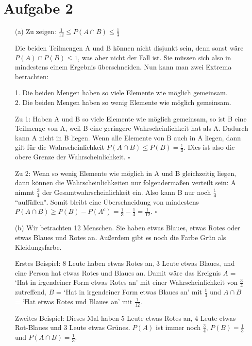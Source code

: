\documentclass[10pt,a4paper]{article}
\begin{document}
\section*{Aufgabe 2}
\begin{itemize}
\item[(a)]
Zu zeigen: $\frac{1}{12} \leq P(A \cap B) \leq \frac{1}{3}$

Die beiden Teilmengen A und B können nicht disjunkt sein, denn sonst wäre $P(A) \cap P(B) \leq 1$, was aber nicht der Fall ist. Sie müssen sich also in mindestens einem Ergebnis überschneiden. Nun kann man zwei Extrema betrachten:

1. Die beiden Mengen haben so viele Elemente wie möglich gemeinsam.\\
2. Die beiden Mengen haben so wenig Elemente wie möglich gemeinsam.

Zu 1: Haben A und B so viele Elemente wie möglich gemeinsam, so ist B eine Teilmenge von A, weil B eine geringere Wahrscheinlichkeit hat als A. Dadurch kann A nicht in B liegen. Wenn alle Elemente von B auch in A liegen, dann gilt für die Wahrscheinlichkeit $P(A \cap B) \leq P(B) = \frac{1}{3}$. Dies ist also die obere Grenze der Wahrscheinlichkeit. $\square$

Zu 2: Wenn so wenig Elemente wie möglich in A und B gleichzeitig liegen, dann können die Wahrscheinlichkeiten nur folgendermaßen verteilt sein:
A nimmt $\frac{3}{4}$ der Gesamtwahrscheinlichkeit ein. Also kann B nur noch $\frac{1}{4}$ ``auffüllen". Somit bleibt eine Überschneidung von mindestens $P(A \cap B) \geq P(B) - P(A^c) = \frac{1}{3} - \frac{1}{4} = \frac{1}{12}$. $\square$

\item[(b)]
Wir betrachten 12 Menschen. Sie haben etwas Blaues, etwas Rotes oder etwas Blaues und Rotes an. Außerdem gibt es noch die Farbe Grün als Kleidungsfarbe.

Erstes Beispiel: 8 Leute haben etwas Rotes an, 3 Leute etwas Blaues, und eine Person hat etwas Rotes und Blaues an. Damit wäre das Ereignis $A$ = `Hat in irgendeiner Form etwas Rotes an' mit einer Wahrscheinlichkeit von $\frac{3}{4}$ zutreffend, $B$ = `Hat in irgendeiner Form etwas Blaues an' mit $\frac{1}{3}$ und $A \cap B$ = `Hat etwas Rotes und Blaues an' mit $\frac{1}{12}$.

Zweites Beispiel: Dieses Mal haben 5 Leute etwas Rotes an, 4 Leute etwas Rot-Blaues und 3 Leute etwas Grünes. $P(A)$ ist immer noch $\frac{3}{4}$, $P(B) = \frac{1}{3}$ und $P(A \cap B) = \frac{1}{3}$.

\end{itemize}
\end{document}
